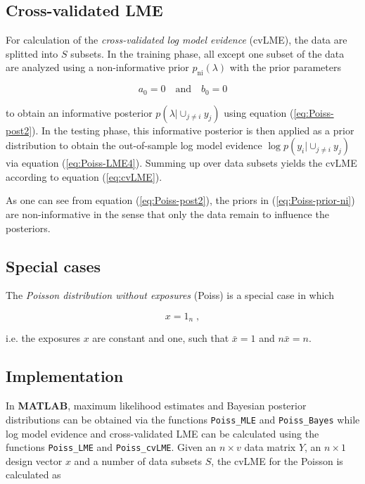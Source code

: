 \subsection{Cross-validated LME} \label{sec:Poiss-cvLME}

For calculation of the \textit{cross-validated log model evidence} (cvLME), the data are splitted into $S$ subsets. In the training phase, all except one subset of the data are analyzed using a non-informative prior $p_\mathrm{ni}(\lambda)$ with the prior parameters

\begin{equation} \label{eq:Poiss-prior-ni}
a_0 = 0 \quad \text{and} \quad b_0 = 0
\end{equation}

to obtain an informative posterior $p(\lambda|\cup_{j \neq i} y_j)$ using equation (\ref{eq:Poiss-post2}). In the testing phase, this informative posterior is then applied as a prior distribution to obtain the out-of-sample log model evidence $\log p(y_i|\cup_{j \neq i} y_j)$ via equation (\ref{eq:Poiss-LME4}). Summing up over data subsets yields the cvLME according to equation (\ref{eq:cvLME}).

As one can see from equation (\ref{eq:Poiss-post2}), the priors in (\ref{eq:Poiss-prior-ni}) are non-informative in the sense that only the data remain to influence the posteriors.


\subsection{Special cases} \label{sec:Poiss-Spec}

The \textit{Poisson distribution without exposures} (Poiss) is a special case in which

\begin{equation} \label{eq:Poiss-exp-Poiss}
x = 1_n \; ,
\end{equation}

i.e. the exposures $x$ are constant and one, such that $\bar{x} = 1$ and $n \bar{x} = n$.


\pagebreak
\subsection{Implementation} \label{sec:Poiss-Imp}

In \textbf{MATLAB}, maximum likelihood estimates and Bayesian posterior distributions can be obtained via the functions \verb|Poiss_MLE| and \verb|Poiss_Bayes| while log model evidence and cross-validated LME can be calculated using the functions \verb|Poiss_LME| and \verb|Poiss_cvLME|. Given an $n \times v$ data matrix $Y$, an $n \times 1$ design vector $x$ and a number of data subsets $S$, the cvLME for the Poisson is calculated as

